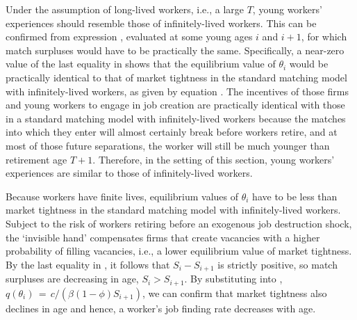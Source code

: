Under the assumption of long-lived workers, i.e., a large $T$,
young workers' experiences should resemble  those of
infinitely-lived workers. This can be confirmed from expression
, evaluated at some young ages $i$ and $i+1$,
for which match surpluses would have to be practically the same.
Specifically, a near-zero value of the last equality
in  shows that the equilibrium value of
$\theta_i$ would be practically identical to that of market
tightness in the standard matching model with infinitely-lived
workers, as given by equation . The incentives of those firms and young workers
to engage in job creation are practically identical with those in a
standard matching model with infinitely-lived workers because the
matches into which they enter will almost certainly break before workers retire,
 and at most of those future separations, the
worker will  still be much younger than
retirement age $T+1$. Therefore, in the setting of this section, young workers' experiences are
similar to those of infinitely-lived workers.

Because workers have  finite lives,  equilibrium values of
$\theta_i$  have to be less than market tightness
in the standard matching model with infinitely-lived workers.
Subject to the risk of workers retiring before an exogenous
job destruction shock, the `invisible hand'
compensates firms that create vacancies with a higher probability
of filling vacancies, i.e., a lower equilibrium value of market
tightness. By the last equality in , it follows
that $S_i - S_{i+1}$ is strictly positive, so  match
surpluses are decreasing in age, $S_i > S_{i+1}$. By
substituting  into ,
$q(\theta_i)\,=\, c / (\beta (1-\phi) S_{i+1})$, we can
confirm that market tightness also declines
in age and hence, a worker's job finding rate  decreases with
age.

